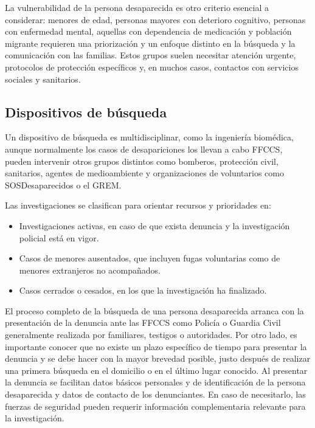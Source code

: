     
    
    La vulnerabilidad de la persona desaparecida es otro criterio esencial a considerar: menores de edad, personas mayores con deterioro cognitivo, personas con enfermedad mental, aquellas con dependencia de medicación y población migrante requieren una priorización y un enfoque distinto en la búsqueda y la comunicación con las familias. Estos grupos suelen necesitar atención urgente, protocolos de protección específicos y, en muchos casos, contactos con servicios sociales y sanitarios.


    
    \subsection{Dispositivos de búsqueda}
    Un dispositivo de búsqueda es multidisciplinar, como la ingeniería biomédica, aunque normalmente los casos de desapariciones los llevan a cabo FFCCS, pueden intervenir otros grupos distintos como bomberos, protección civil, sanitarios, agentes de medioambiente y organizaciones de voluntarios como SOSDesaparecidos o el GREM. \cite{ManualDeBusquedayRescate}

    Las investigaciones se clasifican para orientar recursos y prioridades en:
    \begin{itemize}
        \item Investigaciones activas, en caso de que exista denuncia y la investigación policial está en vigor.
        \item Casos de menores ausentados, que incluyen fugas voluntarias como de menores extranjeros no acompañados.
        \item Casos cerrados o cesados, en los que la investigación ha finalizado. 
    \end{itemize}
    
    El proceso completo de la búsqueda de una persona desaparecida arranca con la presentación de la denuncia ante las FFCCS como Policía o Guardia Civil generalmente realizada por familiares, testigos o autoridades. Por otro lado, es importante conocer que no existe un plazo específico de tiempo para presentar la denuncia y se debe hacer con la mayor brevedad posible, justo después de realizar una primera búsqueda en el domicilio o en el último lugar conocido. Al presentar la denuncia se facilitan datos básicos personales y de identificación de la persona desaparecida y datos de contacto de los denunciantes. En caso de necesitarlo, las fuerzas de seguridad pueden requerir información complementaria relevante para la investigación.\cite{FolletoInfo_personasDes,SOSDesaparecidosActuar}
    
